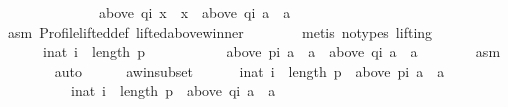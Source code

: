 \begin{isabellebody}
\ \ \ \ \ \ \ \ \ \ \ \ \ \ {\isacharparenleft}{\kern0pt}above\ {\isacharparenleft}{\kern0pt}q{\isacharbang}{\kern0pt}i{\isacharparenright}{\kern0pt}\ x\ {\isacharequal}{\kern0pt}\ {\isacharbraceleft}{\kern0pt}x{\isacharbraceright}{\kern0pt}\ {\isasymor}\ above\ {\isacharparenleft}{\kern0pt}q{\isacharbang}{\kern0pt}i{\isacharparenright}{\kern0pt}\ a\ {\isacharequal}{\kern0pt}\ {\isacharbraceleft}{\kern0pt}a{\isacharbraceright}{\kern0pt}{\isacharparenright}{\kern0pt}{\isacharparenright}{\kern0pt}{\isachardoublequoteclose}\isanewline
\ \ \ \ \ \ \isamarkupfalse%
\ asm{}\ Profile{\isachardot}{\kern0pt}lifted{\isacharunderscore}{\kern0pt}def\ lifted{\isacharunderscore}{\kern0pt}above{\isacharunderscore}{\kern0pt}winner\isanewline
\ \ \ \ \ \ \isamarkupfalse%
\ {\isacharparenleft}{\kern0pt}metis\ {\isacharparenleft}{\kern0pt}no{\isacharunderscore}{\kern0pt}types{\isacharcomma}{\kern0pt}\ lifting{\isacharparenright}{\kern0pt}{\isacharparenright}{\kern0pt}\isanewline
\ \ \ \ \isamarkupfalse%
\isanewline
\ \ \ \ \ \ {\isachardoublequoteopen}{\isasymforall}i{\isacharcolon}{\kern0pt}{\isacharcolon}{\kern0pt}nat{\isachardot}{\kern0pt}\ i\ {\isacharless}{\kern0pt}\ length\ p\ {\isasymlongrightarrow}\isanewline
\ \ \ \ \ \ \ \ \ \ {\isacharparenleft}{\kern0pt}above\ {\isacharparenleft}{\kern0pt}p{\isacharbang}{\kern0pt}i{\isacharparenright}{\kern0pt}\ a\ {\isacharequal}{\kern0pt}\ {\isacharbraceleft}{\kern0pt}a{\isacharbraceright}{\kern0pt}\ {\isasymlongrightarrow}\ above\ {\isacharparenleft}{\kern0pt}q{\isacharbang}{\kern0pt}i{\isacharparenright}{\kern0pt}\ a\ {\isacharequal}{\kern0pt}\ {\isacharbraceleft}{\kern0pt}a{\isacharbraceright}{\kern0pt}{\isacharparenright}{\kern0pt}{\isachardoublequoteclose}\isanewline
\ \ \ \ \ \ \isamarkupfalse%
\ asm{}\isanewline
\ \ \ \ \ \ \isamarkupfalse%
\ auto\isanewline
\ \ \ \ \isamarkupfalse%
\ a{\isacharunderscore}{\kern0pt}win{\isacharunderscore}{\kern0pt}subset{\isacharcolon}{\kern0pt}\isanewline
\ \ \ \ \ \ {\isachardoublequoteopen}{\isacharbraceleft}{\kern0pt}i{\isacharcolon}{\kern0pt}{\isacharcolon}{\kern0pt}nat{\isachardot}{\kern0pt}\ i\ {\isacharless}{\kern0pt}\ length\ p\ {\isasymand}\ above\ {\isacharparenleft}{\kern0pt}p{\isacharbang}{\kern0pt}i{\isacharparenright}{\kern0pt}\ a\ {\isacharequal}{\kern0pt}\ {\isacharbraceleft}{\kern0pt}a{\isacharbraceright}{\kern0pt}{\isacharbraceright}{\kern0pt}\ {\isasymsubseteq}\isanewline
\ \ \ \ \ \ \ \ \ \ {\isacharbraceleft}{\kern0pt}i{\isacharcolon}{\kern0pt}{\isacharcolon}{\kern0pt}nat{\isachardot}{\kern0pt}\ i\ {\isacharless}{\kern0pt}\ length\ p\ {\isasymand}\ above\ {\isacharparenleft}{\kern0pt}q{\isacharbang}{\kern0pt}i{\isacharparenright}{\kern0pt}\ a\ {\isacharequal}{\kern0pt}\ {\isacharbraceleft}{\kern0pt}a{\isacharbraceright}{\kern0pt}{\isacharbraceright}{\kern0pt}{\isachardoublequoteclose}\isanewline

\end{isabellebody}
